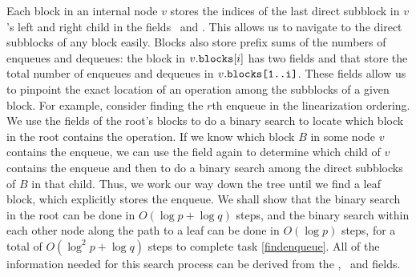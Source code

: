 Each block in an internal node $v$ stores the indices of the last direct subblock in $v$'s left and right child in the fields \eleft\ and \eright.  This allows us to navigate to the direct subblocks of any block easily.
Blocks also store prefix sums of the numbers of enqueues and dequeues:
the block in $v.{\normalfont{\texttt{blocks}}}[i]$ has two fields  and 
that store the total number of enqueues and dequeues in $v.{\normalfont{\texttt{blocks[1..i]}}}$.
These fields allow us to pinpoint the exact location of an operation among the subblocks of a given block.
For example, consider finding the $r$th enqueue in the linearization ordering.
We use the  fields of the root's blocks to do a binary search
to locate which block in the root contains the operation.
If we know which block $B$ in some node $v$ contains the enqueue,
we can use the  field again to determine which child of $v$ contains the enqueue
and then to do a binary search
among the direct subblocks of $B$ in that child.
Thus, we work our way down the tree until we find a leaf block, which explicitly stores 
the enqueue.
We shall show that the binary search in the root can be done in $O(\log p + \log q)$ steps,
and the binary search within each other node along the path to a leaf can be done in $O(\log p)$ steps,
for a total of $O(\log^2 p + \log q)$ steps to complete task \ref{findenqueue}.
All of the information needed for this search process can be derived from the 
\eleft, \eright\ and  fields.

